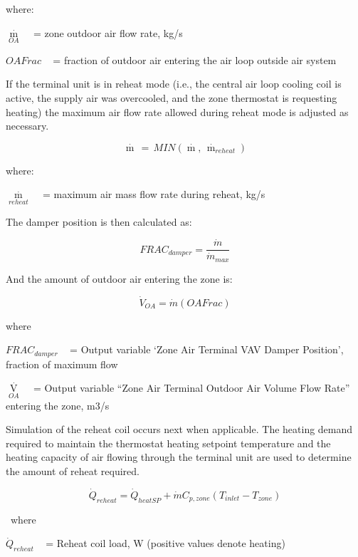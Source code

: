 where:

\({\mathop m\limits^\cdot_{OA}}\) ~ = zone outdoor air flow rate, kg/s

\(OAFrac\) ~ = fraction of outdoor air entering the air loop outside air system

If the terminal unit is in reheat mode (i.e., the central air loop cooling coil is active, the supply air was overcooled, and the zone thermostat is requesting heating) the maximum air flow rate allowed during reheat mode is adjusted as necessary.

\begin{equation}
\mathop m\limits^\cdot  \, = \,MIN\left( {\mathop m\limits^\cdot  ,\,{{\mathop m\limits^\cdot  }_{reheat}}} \right)
\end{equation}

where:

\({\mathop m\limits^\cdot_{reheat}}\) ~ = maximum air mass flow rate during reheat, kg/s

The damper position is then calculated as:

\begin{equation}
FRAC_{damper} = \frac{\dot m}{\dot m_{max}}
\end{equation}

And the amount of outdoor air entering the zone is:

\begin{equation}
\dot V_{OA} = \dot m (OAFrac)
\end{equation}

where

\(FRAC_{damper}\) ~ = Output variable `Zone Air Terminal VAV Damper Position', fraction of maximum flow

\({\mathop V\limits^\cdot_{OA}}\) ~ = Output variable ``Zone Air Terminal Outdoor Air Volume Flow Rate'' entering the zone, m3/s

Simulation of the reheat coil occurs next when applicable. The heating demand required to maintain the thermostat heating setpoint temperature and the heating capacity of air flowing through the terminal unit are used to determine the amount of reheat required.

\begin{equation}
{\dot Q_{reheat}} = {\dot Q_{heatSP}} + \dot m C_{p,zone}(T_{inlet}-T_{zone})
\end{equation}

~where

\({\dot Q_{reheat}}\) ~ = Reheat coil load, W (positive values denote heating)

